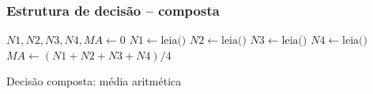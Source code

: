 \documentclass{beamer}
\begin{document}
\begin{frame}[fragile]
\frametitle{Estrutura de decisão -- composta}

\begin{algorithm}[H]
\scriptsize
\DontPrintSemicolon
{}
\BlankLine
{}
$N1, N2, N3, N4, MA \gets 0$\;
\BlankLine
{}
$N1 \gets \text{leia()}$\;
$N2 \gets \text{leia()}$\;
$N3 \gets \text{leia()}$\;
$N4 \gets \text{leia()}$\;
\BlankLine
{}
$MA \gets (N1 + N2 + N3 + N4) / 4$\;
\BlankLine
{}
\caption{Decisão composta: média aritmética}
\label{alg:decisao-composta}
\end{algorithm}
\end{frame}
\end{document}
